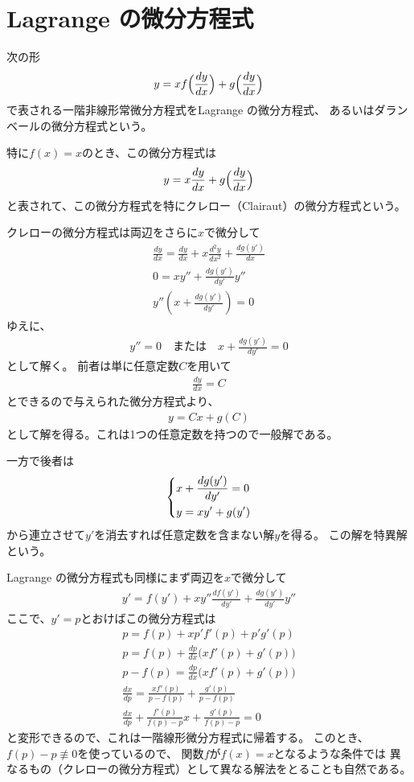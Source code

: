 \section{Lagrange の微分方程式}
次の形
\begin{gather}
  y = x f\Bigl(\frac{dy}{dx}\Bigr) + g\Bigl(\frac{dy}{dx}\Bigr)
\end{gather}
で表される一階非線形常微分方程式をLagrange の微分方程式、
あるいはダランベールの微分方程式という。

特に$f(x) = x$のとき、この微分方程式は
\begin{gather}
  y = x \frac{dy}{dx} + g\Bigl(\frac{dy}{dx}\Bigr)
\end{gather}
と表されて、この微分方程式を特にクレロー（Clairaut）の微分方程式という。

クレローの微分方程式は両辺をさらに$x$で微分して
\begin{gather}
  \frac{dy}{dx} = \frac{dy}{dx} + x \frac{d^2y}{dx^2} + \frac{dg(y')}{dx} \\
  0 = xy'' + \frac{dg(y')}{dy'} y'' \\
  y''\left(x + \frac{dg(y')}{dy'}\right) = 0
\end{gather}
ゆえに、
\begin{gather}
  y'' = 0 \quad\text{または}\quad x + \frac{dg(y')}{dy'} = 0
\end{gather}
として解く。
前者は単に任意定数$C$を用いて
\begin{gather}
  \frac{dy}{dx} = C
\end{gather}
とできるので与えられた微分方程式より、
\begin{gather}
  y = Cx + g(C)
\end{gather}
として解を得る。これは1つの任意定数を持つので一般解である。

一方で後者は
\begin{gather}
  \begin{dcases*}
    x + \frac{dg(y')}{dy'} = 0 \\
    y = xy' + g(y')
  \end{dcases*}
\end{gather}
から連立させて$y'$を消去すれば任意定数を含まない解$y$を得る。
この解を特異解という。

Lagrange の微分方程式も同様にまず両辺を$x$で微分して
\begin{gather}
  y' = f(y') + xy''\frac{df(y')}{dy'} + \frac{dg(y')}{dy'}y''
\end{gather}
ここで、$y' = p$とおけばこの微分方程式は
\begin{gather}
  p = f(p) + xp' f'(p) + p'g'(p) \\
  p = f(p) + \frac{dp}{dx} \bigl(xf'(p) + g'(p)\bigr) \\
  p - f(p) = \frac{dp}{dx} \bigl(xf'(p) + g'(p)\bigr) \\
  \frac{dx}{dp} = \frac{xf'(p)}{p - f(p)} + \frac{g'(p)}{p - f(p)} \\
  \frac{dx}{dp} + \frac{f'(p)}{f(p) - p} x + \frac{g'(p)}{f(p) - p} = 0
\end{gather}
と変形できるので、これは一階線形微分方程式に帰着する。
このとき、$f(p) - p \not\equiv 0$を使っているので、%
関数$f$が$f(x) = x$となるような条件では
異なるもの（クレローの微分方程式）として異なる解法をとることも自然である。
